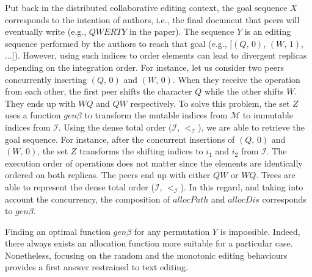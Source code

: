 Put back in the distributed collaborative editing context, the goal sequence
$X$ corresponds to the intention of authors, i.e., the final document that
peers will eventually write (e.g., $QWERTY$ in the paper). The sequence $Y$ is
an editing sequence performed by the authors to reach that goal (e.g.,
$[(Q,\,0)$, $(W,\,1)$, $\ldots]$). However, using such indices to order
elements can lead to divergent replicas depending on the integration order. For
instance, let us consider two peers concurrently inserting $(Q,\,0)$ and
$(W,\,0)$. When they receive the operation from each other, the first peer
shifts the character $Q$ while the other shifts $W$. They ends up with $WQ$ and
$QW$ respectively. To solve this problem, the set $Z$ uses a function
$gen\beta$ to transform the mutable indices from $\mathcal{M}$ to immutable
indices from $\mathcal{I}$. Using the dense total order ($\mathcal{I},\,
<_\mathcal{I}$), we are able to retrieve the goal sequence. For instance, after
the concurrent insertions of $(Q,\,0)$ and $(W,\,0)$, the set $Z$ transforms
the shifting indices to $i_1$ and $i_2$ from $\mathcal{I}$. The execution order
of operations does not matter since the elements are identically ordered on
both replicas. The peers end up with either $QW$ or $WQ$. Trees are able to
represent the dense total order ($\mathcal{I},\, <_\mathcal{I}$). In this
regard, and taking into account the concurrency, the composition of $allocPath$
and $allocDis$ corresponds to $gen\beta$.

Finding an optimal function $gen\beta$ for any permutation $Y$ is
impossible. Indeed, there always exists an allocation function more suitable
for a particular case. Nonetheless, focusing on the random and the monotonic
editing behaviours provides a first answer restrained to text editing.

